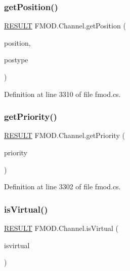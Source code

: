 \mbox{\label{class_f_m_o_d_1_1_channel_ae636f6655910d216554bf87d51a2fad9}} 
\subsubsection{\texorpdfstring{get\+Position()}{getPosition()}}
{\footnotesize\ttfamily \hyperlink{namespace_f_m_o_d_a305d1176ef3f8c8815861a60407ac33d}{R\+E\+S\+U\+LT} F\+M\+O\+D.\+Channel.\+get\+Position (\begin{DoxyParamCaption}\item[{out uint}]{position,  }\item[{\hyperlink{namespace_f_m_o_d_aff20975332f93ff2180d2681cb43929f}{T\+I\+M\+E\+U\+N\+IT}}]{postype }\end{DoxyParamCaption})}



Definition at line 3310 of file fmod.\+cs.

\mbox{\label{class_f_m_o_d_1_1_channel_a6f71b3cb883ef8e0415a081e61cc08c1}} 
\subsubsection{\texorpdfstring{get\+Priority()}{getPriority()}}
{\footnotesize\ttfamily \hyperlink{namespace_f_m_o_d_a305d1176ef3f8c8815861a60407ac33d}{R\+E\+S\+U\+LT} F\+M\+O\+D.\+Channel.\+get\+Priority (\begin{DoxyParamCaption}\item[{out int}]{priority }\end{DoxyParamCaption})}



Definition at line 3302 of file fmod.\+cs.

\mbox{\label{class_f_m_o_d_1_1_channel_af4006487a422ae9f7ee211c417879ed8}} 
\subsubsection{\texorpdfstring{is\+Virtual()}{isVirtual()}}
{\footnotesize\ttfamily \hyperlink{namespace_f_m_o_d_a305d1176ef3f8c8815861a60407ac33d}{R\+E\+S\+U\+LT} F\+M\+O\+D.\+Channel.\+is\+Virtual (\begin{DoxyParamCaption}\item[{out bool}]{isvirtual }\end{DoxyParamCaption})}



